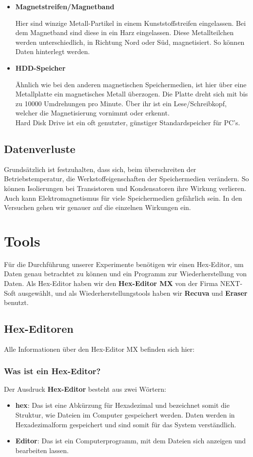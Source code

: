 \documentclass[10pt,a4paper]{article} %
\begin{document}
\begin{itemize}
\item \textbf{Magnetstreifen/Magnetband}

Hier sind winzige Metall-Partikel in einem Kunststoffstreifen eingelassen. Bei dem Magnetband sind diese in ein Harz eingelassen. Diese Metallteilchen werden unterschiedlich, in Richtung Nord oder Süd, magnetisiert. So können Daten hinterlegt werden.\cite{Magnetstreifen}

\item \textbf{HDD-Speicher}

Ähnlich wie bei den anderen magnetischen Speichermedien, ist hier über eine Metallplatte ein magnetisches Metall überzogen. Die Platte dreht sich mit bis zu 10000 Umdrehungen pro Minute. Über ihr ist ein Lese/Schreibkopf, welcher die Magnetisierung vornimmt oder erkennt.\\
Hard Disk Drive ist ein oft genutzter, günstiger Standardspeicher für PC's.
\end{itemize}


\subsection{Datenverluste}
Grundsätzlich ist festzuhalten, dass sich, beim überschreiten der Betriebstemperatur, die Werkstoffeigenschaften der Speichermedien verändern. So können Isolierungen bei Transistoren und Kondensatoren ihre Wirkung verlieren. Auch kann Elektromagnetismus für viele Speichermedien gefährlich sein. In den Versuchen gehen wir genauer auf die einzelnen Wirkungen ein.


\section{Tools}
Für die Durchführung unserer Experimente benötigen wir einen Hex-Editor, um Daten genau betrachtet zu können und ein Programm zur Wiederherstellung von Daten. Als Hex-Editor haben wir den \textbf{Hex-Editor MX} von der Firma NEXT-Soft ausgewählt, und als Wiederherstellungstools haben wir \textbf{Recuva} und \textbf{Eraser} benutzt. 
\subsection{Hex-Editoren}
Alle Informationen über den Hex-Editor MX befinden sich hier: \cite{HexUM}
\subsubsection{Was ist ein Hex-Editor?}
Der Ausdruck \textbf{Hex-Editor} besteht aus zwei Wörtern:
\begin{itemize}
\item
\textbf{hex}: Das ist eine Abkürzung für Hexadezimal und bezeichnet somit die Struktur, wie Dateien im Computer gespeichert werden. Daten werden in Hexadezimalform gespeichert und sind somit für das System verständlich.
\item
\textbf{Editor}: Das ist ein Computerprogramm, mit dem Dateien sich anzeigen und bearbeiten lassen.
\end{itemize}
\end{document}
